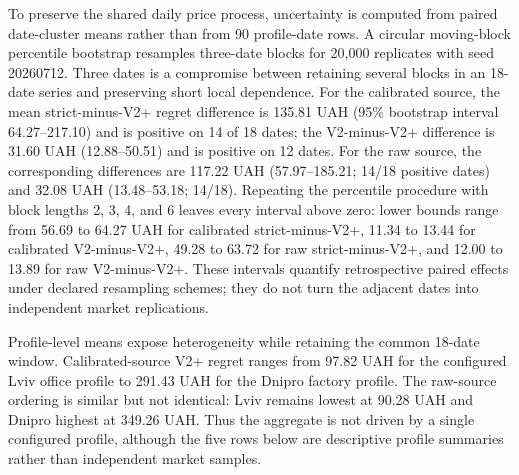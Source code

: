 To preserve the shared daily price process, uncertainty is computed from paired date-cluster means rather than from 90 profile-date rows. A circular moving-block percentile bootstrap resamples three-date blocks for 20,000 replicates with seed 20260712. Three dates is a compromise between retaining several blocks in an 18-date series and preserving short local dependence. For the calibrated source, the mean strict-minus-V2+ regret difference is 135.81 UAH (95\% bootstrap interval 64.27--217.10) and is positive on 14 of 18 dates; the V2-minus-V2+ difference is 31.60 UAH (12.88--50.51) and is positive on 12 dates. For the raw source, the corresponding differences are 117.22 UAH (57.97--185.21; 14/18 positive dates) and 32.08 UAH (13.48--53.18; 14/18). Repeating the percentile procedure with block lengths 2, 3, 4, and 6 leaves every interval above zero: lower bounds range from 56.69 to 64.27 UAH for calibrated strict-minus-V2+, 11.34 to 13.44 for calibrated V2-minus-V2+, 49.28 to 63.72 for raw strict-minus-V2+, and 12.00 to 13.89 for raw V2-minus-V2+. These intervals quantify retrospective paired effects under declared resampling schemes; they do not turn the adjacent dates into independent market replications.

\begin{table}[t]
\centering
\caption{Paired date-cluster differences in mean regret (comparator minus V2+, UAH).}
\label{tab:05:results:3}
\small
{}
\end{table}

Profile-level means expose heterogeneity while retaining the common 18-date window. Calibrated-source V2+ regret ranges from 97.82 UAH for the configured Lviv office profile to 291.43 UAH for the Dnipro factory profile. The raw-source ordering is similar but not identical: Lviv remains lowest at 90.28 UAH and Dnipro highest at 349.26 UAH. Thus the aggregate is not driven by a single configured profile, although the five rows below are descriptive profile summaries rather than independent market samples.

